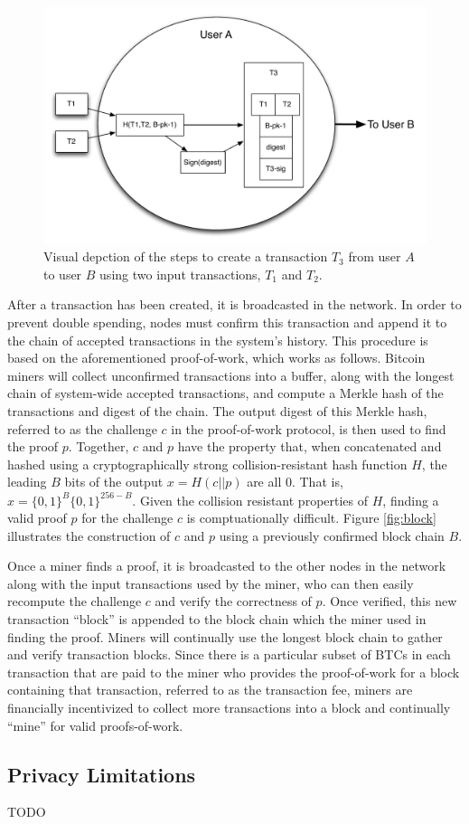 \begin{center}
\begin{figure}
\includegraphics[scale=0.4]{./images/transaction_create.pdf}
\caption{Visual depction of the steps to create a transaction $T_3$ from user $A$ to user $B$ using two input transactions, $T_1$ and $T_2$.}
\end{figure}
\end{center}

After a transaction has been created, it is broadcasted in the network. In order to prevent double spending, nodes must confirm this transaction and append it to the chain of accepted transactions in the system's history. This procedure is based on the aforementioned proof-of-work, which works as follows. Bitcoin miners will collect unconfirmed transactions into a buffer, along with the longest chain of system-wide accepted transactions, and compute a Merkle hash of the transactions and digest of the chain. The output digest of this Merkle hash, referred to as the challenge $c$ in the proof-of-work protocol, is then used to find the proof $p$. Together, $c$ and $p$ have the property that, when concatenated and hashed using a cryptographically strong collision-resistant hash function $H$, the leading $B$ bits of the output $x = H(c || p)$ are all $0$. That is, $x = \{0,1\}^B\{0,1\}^{256-B}$. Given the collision resistant properties of $H$, finding a valid proof $p$ for the challenge $c$ is comptuationally difficult. Figure \ref{fig:block} illustrates the construction of $c$ and $p$ using a previously confirmed block chain $B$.

Once a miner finds a proof, it is broadcasted to the other nodes in the network along with the input transactions used by the miner, who can then easily recompute the challenge $c$ and verify the correctness of $p$. Once verified, this new transaction ``block'' is appended to the block chain which the miner used in finding the proof. Miners will continually use the longest block chain to gather and verify transaction blocks. Since there is a particular subset of BTCs in each transaction that are paid to the miner who provides the proof-of-work for a block containing that transaction, referred to as the transaction fee, miners are financially incentivized to collect more transactions into a block and continually ``mine'' for valid proofs-of-work. 

\subsection{Privacy Limitations}
TODO


